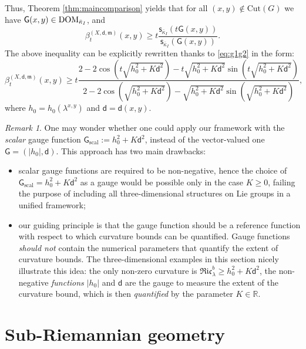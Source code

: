 \documentclass[11pt,a4paper]{article}
\theoremstyle{plain}
\theoremstyle{definition}
\theoremstyle{remark}
\newtheorem{remark}[theorem]{Remark}
\numberwithin{equation}{section}
\newcommand{\R}{\mathbb{R}} %
\newcommand{\Cut}{\mathrm{Cut}}
\newcommand{\DOM}{{\rm{DOM}}}
\newcommand{\sfs}{\mathsf{s}}
\newcommand{\mm}{\mathfrak m}
\newcommand{\sfd}{\mathsf d}
\newcommand{\sfG}{\mathsf G}
\begin{document}
Thus, Theorem \ref{thm:maincomparison} yields that for all $(x,y) \notin \Cut(G)$ we have $\sfG(x,y)\in \DOM_{\bar\kappa_{I}}$, and
\begin{equation}
\beta_{t}^{(X,\sfd,\mm)}(x,y)\geq t\frac{\sfs_{\bar \kappa_{I}}(t \sfG(x,y))}{\sfs_{\bar \kappa_{I}}(\sfG(x,y))}.
\end{equation}
The above inequality can be explicitly rewritten thanks to \eqref{eq:g1g2} in the form:
\begin{equation}
\beta_{t}^{(X,\sfd,\mm)}(x,y)\geq 
t\frac{2 -2 \cos \left(t\sqrt{h_{0}^{2}+K \sfd^{2}} \right)-t\sqrt{h_{0}^{2}+K \sfd^{2}}  
\sin \left(t\sqrt{h_{0}^{2}+K \sfd^{2}} \right) }
{2 -2 \cos \left(\sqrt{h_{0}^{2}+K \sfd^{2}} \right)-\sqrt{h_{0}^{2}+K \sfd^{2}}  
\sin \left(\sqrt{h_{0}^{2}+K \sfd^{2}} \right)},
\end{equation}
 where $h_0 = h_0(\lambda^{x,y})$ and $\sfd = \sfd(x,y)$. 


 
\begin{remark}  One may wonder whether one could apply our framework with the \emph{scalar} gauge function $\sfG_{\mathrm{scal}}:=h_{0}^{2}+K \sfd^{2}$, instead of the vector-valued one $\sfG = (|h_0|,\sfd)$. This approach has two main drawbacks:
\begin{itemize}
\item scalar gauge functions are required to be non-negative, hence the choice of $\sfG_{\mathrm{scal}}=h_{0}^{2}+K \sfd^{2}$ as a gauge would be possible only in the case $K\geq 0$,  failing the purpose of including all three-dimensional structures on Lie groups in a unified framework;
\item   our guiding principle is that the gauge function should be  a reference function with respect to which curvature bounds can be quantified.  Gauge functions \emph{should not} contain the numerical parameters that quantify the extent of curvature bounds. The three-dimensional examples in this section nicely illustrate this idea: the only non-zero curvature is $\mathfrak{Ric}_\lambda^b\geq h_0^2 + K \sfd^2$, the non-negative \emph{functions} $|h_0|$ and $\sfd$ are the gauge to measure the extent of the curvature bound, which is then \emph{quantified} by the parameter $K\in \R$.
\end{itemize}
\end{remark}





\appendix

\section{Sub-Riemannian geometry}\label{a:SR}
\end{document}
